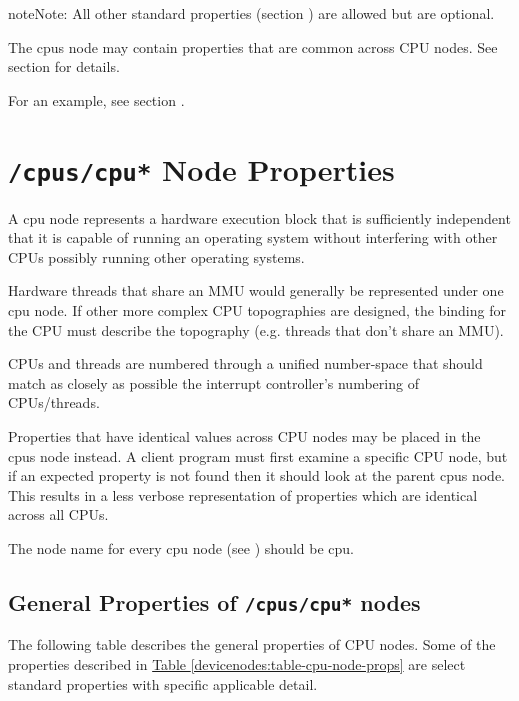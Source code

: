 \documentclass[a4paper,10pt,oneside]{sphinxmanual}
\begin{document}
\begin{notice}{note}{Note:}
All other standard properties (section
{\hyperref[devicetree\string-basics:sect\string-standard\string-properties]{}}) are allowed but are optional.
\end{notice}

The cpus node may contain properties that are common across CPU nodes.
See section {\hyperref[devicenodes:sect\string-cpus\string-cpu\string-node\string-properties]{}} for details.

For an example, see section {\hyperref[devicenodes:sect\string-cpu\string-node\string-example]{}}.


\section{\texttt{/cpus/cpu*} Node Properties}
\label{devicenodes:sect-cpus-cpu-node-properties}\label{devicenodes:cpus-cpu-node-properties}
A cpu node represents a hardware execution block that is sufficiently
independent that it is capable of running an operating system without
interfering with other CPUs possibly running other operating systems.

Hardware threads that share an MMU would generally be represented under
one cpu node. If other more complex CPU topographies are designed, the
binding for the CPU must describe the topography (e.g. threads that
don’t share an MMU).

CPUs and threads are numbered through a unified number-space that should
match as closely as possible the interrupt controller’s numbering of
CPUs/threads.

Properties that have identical values across CPU nodes may be placed in
the cpus node instead. A client program must first examine a specific
CPU node, but if an expected property is not found then it should look
at the parent cpus node. This results in a less verbose representation
of properties which are identical across all CPUs.

The node name for every cpu node (see {\hyperref[devicetree\string-basics:sect\string-node\string-names]{}}) should be
cpu.


\subsection{General Properties of \texttt{/cpus/cpu*} nodes}
\label{devicenodes:general-properties-of-cpus-cpu-nodes}
The following table describes the general properties of CPU nodes. Some
of the properties described in \hyperref[devicenodes:table-cpu-node-props]{Table \ref{devicenodes:table-cpu-node-props}} are select
standard properties with specific applicable detail.
\end{document}
